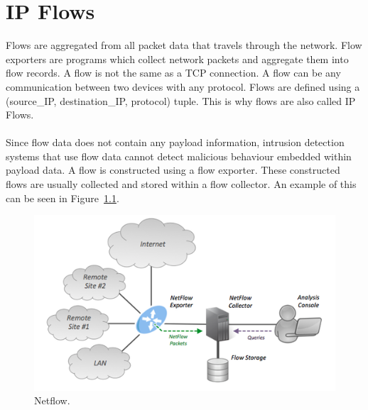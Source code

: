 
\chapter{IP Flows} %

\label{flow}

Flows are aggregated from all packet data that travels through the network. Flow exporters are programs which collect network packets and aggregate them into flow records. A flow is not the same as a TCP connection. A flow can be any communication between two devices with any protocol. Flows are defined using a (source\_IP, destination\_IP, protocol) tuple. This is why flows are also called IP Flows.\\
\\
Since flow data does not contain any payload information, intrusion detection systems that use flow data cannot detect malicious behaviour embedded within payload data. \cite{IPFlow} A flow is constructed using a flow exporter. These constructed flows are usually collected and stored within a flow collector. An example of this can be seen in Figure~\ref{fig:netflow}.

 \begin{figure}[H]
\centering
\includegraphics[width=1\textwidth]{Figures/netflow}
\decoRule
\caption[Netflow]{Netflow. \cite{netflowExample}}
\label{fig:netflow}
\end{figure}

